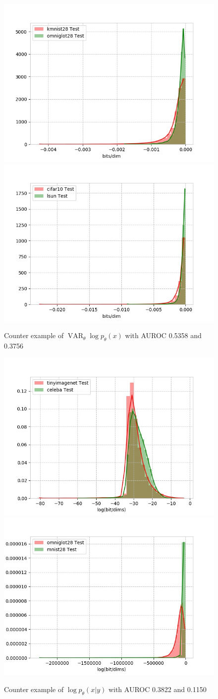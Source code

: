 \documentclass[a3paper]{article}
\begin{document}
\begin{figure}[H]
\includegraphics[width=0.5\columnwidth]{figures/var_log_prob_histogram}
\includegraphics[width=0.5\columnwidth]{figures/var_log_prob_histogram-1}
\caption{Counter example of $\mathop{VAR}_\theta \log p_\theta(x)$ with AUROC 0.5358 and 0.3756}
\end{figure}

\begin{figure}[H]
\includegraphics[width=0.5\columnwidth]{figures/log_prob_histogram-5}
\includegraphics[width=0.5\columnwidth]{figures/log_prob_histogram-6}
\caption{Counter example of $\log p_\theta(x|y)$ with AUROC 0.3822 and 0.1150}
\end{figure}
\end{document}
